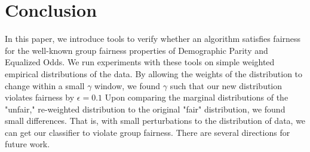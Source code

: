 \documentclass[11pt]{article}
\newcommand{\WW}{\mathcal{W}}
\newcommand{\eps}{\varepsilon}
\begin{document}


\section{Conclusion}
In this paper, we introduce tools to verify whether an algorithm satisfies fairness for the well-known group fairness properties of Demographic Parity and Equalized Odds. We run experiments with these tools on simple weighted empirical distributions of the data. By allowing the weights of the distribution to change within a small $\gamma$ window, we found $\gamma$ such that our new distribution violates fairness by $\epsilon = 0.1$ Upon comparing the marginal distributions of the "unfair," re-weighted distribution to the original "fair" distribution, we found small differences. That is, with small perturbations to the distribution of data, we can get our classifier to violate group fairness. There are several directions for future work.
\end{document}
